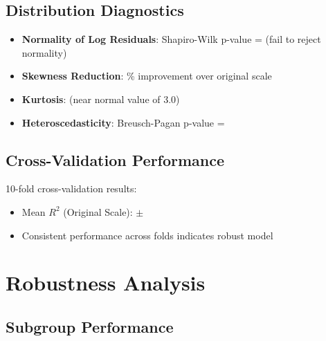 \subsection{Distribution Diagnostics}

\begin{itemize}
    \item \textbf{Normality of Log Residuals}: Shapiro-Wilk p-value = \ModelSixShapiroPValue{} (fail to reject normality)
    \item \textbf{Skewness Reduction}: \ModelSixSkewnessReduction{}\% improvement over original scale
    \item \textbf{Kurtosis}: \ModelSixKurtosis{} (near normal value of 3.0)
    \item \textbf{Heteroscedasticity}: Breusch-Pagan p-value = \ModelSixHeteroscedasticityTest{}
\end{itemize}

\subsection{Cross-Validation Performance}

10-fold cross-validation results:
\begin{itemize}
    \item Mean $R^2$ (Original Scale): \ModelSixCVMean{} $\pm$ \ModelSixCVStd{}
    \item Consistent performance across folds indicates robust model
\end{itemize}

\section{Robustness Analysis}

\subsection{Subgroup Performance}


